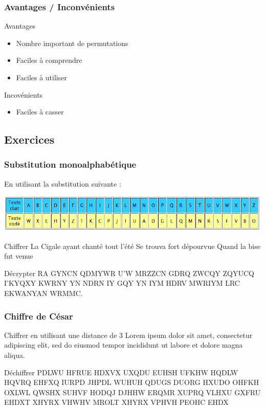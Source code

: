 \documentclass[xcolor={dvipsnames}]{beamer}
\begin{document}
\begin{frame}
\frametitle{Avantages / Inconvénients}

\begin{exampleblock}{Avantages}
	\begin{itemize}
		\item Nombre important de permutations
		\item Faciles à comprendre
		\item Faciles à utiliser
	\end{itemize}
\end{exampleblock}

\begin{alertblock}{Incovénients}
	\begin{itemize}
		\item Faciles à casser
	\end{itemize}
\end{alertblock}
\end{frame}

\subsection{Exercices}
\begin{frame}
	\frametitle{Substitution monoalphabétique}	
	
	En utilisant la substitution suivante :
	\begin{center}
		\includegraphics[scale=0.65]{subst}
	\end{center}
	
	\begin{block}{Chiffrer}
		La Cigale ayant chanté tout l'été
		Se trouva fort dépourvue
		Quand la bise fut venue
	\end{block}
	
	\begin{block}{Décrypter}
		RA GYNCN QDMYWR U'W MRZZCN GDRQ ZWCQY ZQYUCQ I'KYQXY KWRNY YN NDRN IY GQY YN IYM HDRV MWRIYM LRC EKWANYAN WRMMC.
	\end{block}
\end{frame}

\begin{frame}
	\frametitle{Chiffre de César}	
	
	\begin{block}{Chiffrer en utilisant une distance de 3}
		Lorem ipsum dolor sit amet, consectetur adipiscing elit, sed do eiusmod tempor incididunt ut labore et dolore magna aliqua. 
	\end{block}
	
	\begin{block}{Déchiffrer}
		PDLWU HFRUE HDXVX UXQDU EUHSH UFKHW HQDLW HQVRQ EHFXQ IURPD JHPDL WUHUH QDUGS DUORG HXUDO OHFKH OXLWL QWSHX SUHVF HODQJ DJHHW ERQMR XUPRQ VLHXU GXFRU EHDXT XHYRX VHWHV MROLT XHYRX VPHVH PEOHC EHDX
	\end{block}
\end{frame}
\end{document}
